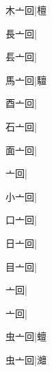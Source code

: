 \begin{multicols}{2}
{{\cjk{}木亠回}|{\cjk{}檀}\par
{\cjk{}長亠回}|{}\par
{\cjk{}镸亠回}|{}\par
{\cjk{}馬亠回}|{\cjk{}驙}\par
{\cjk{}酉亠回}|{}\par
{\cjk{}石亠回}|{}\par
{\cjk{}面亠回}|{}\par
{亠回}|{}\par
{\cjk{}小亠回}|{}\par
{\cjk{}口亠回}|{}\par
{\cjk{}日亠回}|{}\par
{\cjk{}目亠回}|{}\par
{亠回}|{}\par
{亠回}|{}\par
{\cjk{}虫亠回}|{\cjk{}蟺}\par
{\cjk{}虫亠回}|{\cjk{}灗}\par
}
\end{multicols}

